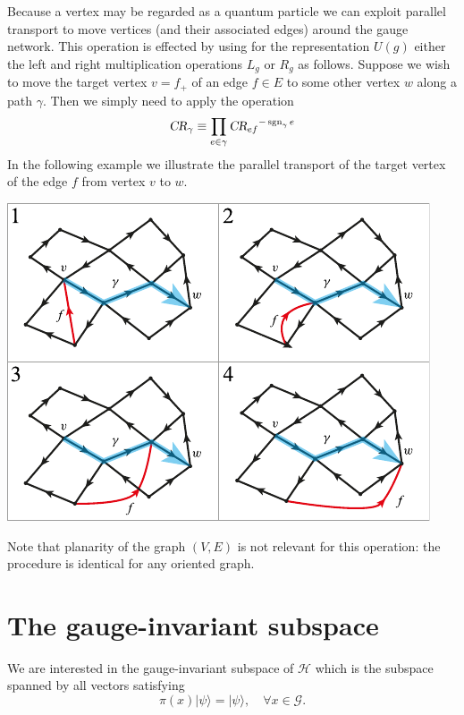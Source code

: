 \documentclass[12pt]{amsart}
\newcommand{\sgn}{\operatorname{sgn}}
\def\CR{\textsl{CR}}
\theoremstyle{definition}
\theoremstyle{remark}
\numberwithin{equation}{section}
\begin{document}
Because a vertex may be regarded as a quantum particle we can exploit parallel transport to move vertices (and their associated edges) around the gauge network. This operation is effected by using for the representation $U(g)$ either the left and right multiplication operations $L_g$ or $R_g$ as follows. Suppose we wish to move the target vertex $v = f_+$ of an edge $f \in E$ to some other vertex $w$ along a path $\gamma$. Then we simply need to apply the operation
\begin{equation}
	\CR_\gamma \equiv \prod_{e\in \gamma} {\CR_{e f}}^{-\sgn_\gamma{e}}
\end{equation}
In the following example we illustrate the parallel transport of the target vertex of the edge $f$ from vertex $v$ to $w$.
\begin{center}
	\includegraphics{edgetx.pdf}
\end{center}
Note that planarity of the graph $(V,E)$ is not relevant for this operation: the procedure is identical for any oriented graph.


\section{The gauge-invariant subspace}
We are interested in the gauge-invariant subspace of $\mathcal{H}$ which is the subspace spanned by all vectors satisfying
\begin{equation}
	\pi(x) |\psi\rangle = |\psi\rangle, \quad \forall x \in \mathcal{G}.
\end{equation}
\end{document}
